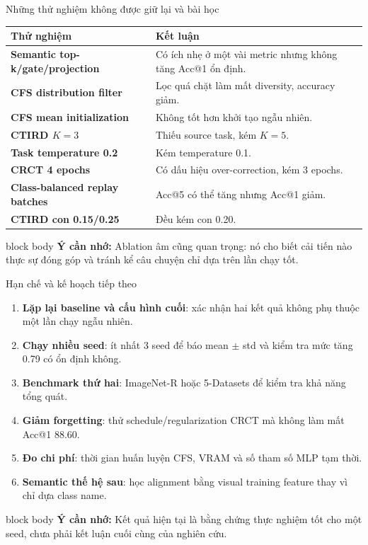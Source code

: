 \documentclass[aspectratio=169,11pt]{beamer}
\newcommand{\remember}[1]{%
  \vfill
  \begin{beamercolorbox}[wd=\textwidth,sep=0.22cm,rounded=true]{block body}
    \textbf{Ý cần nhớ:} #1
  \end{beamercolorbox}
}
\begin{document}
\begin{frame}{Những thử nghiệm không được giữ lại và bài học}
  \small
  \begin{tabularx}{\textwidth}{>{\bfseries}p{3.25cm} X}
    \toprule
    Thử nghiệm & Kết luận \\
    \midrule
    Semantic top-k/gate/projection & Có ích nhẹ ở một vài metric nhưng không tăng Acc@1 ổn định. \\
    CFS distribution filter & Lọc quá chặt làm mất diversity, accuracy giảm. \\
    CFS mean initialization & Không tốt hơn khởi tạo ngẫu nhiên. \\
    CTIRD $K=3$ & Thiếu source task, kém $K=5$. \\
    Task temperature 0.2 & Kém temperature 0.1. \\
    CRCT 4 epochs & Có dấu hiệu over-correction, kém 3 epochs. \\
    Class-balanced replay batches & Acc@5 có thể tăng nhưng Acc@1 giảm. \\
    CTIRD con 0.15/0.25 & Đều kém con 0.20. \\
    \bottomrule
  \end{tabularx}
  \remember{Ablation âm cũng quan trọng: nó cho biết cải tiến nào thực sự đóng góp và tránh kể câu chuyện chỉ dựa trên lần chạy tốt.}
\end{frame}

\begin{frame}{Hạn chế và kế hoạch tiếp theo}
  \begin{enumerate}\setlength\itemsep{0.35cm}
    \item \textbf{Lặp lại baseline và cấu hình cuối}: xác nhận hai kết quả không phụ thuộc một lần chạy ngẫu nhiên.
    \item \textbf{Chạy nhiều seed}: ít nhất 3 seed để báo mean $\pm$ std và kiểm tra mức tăng 0.79 có ổn định không.
    \item \textbf{Benchmark thứ hai}: ImageNet-R hoặc 5-Datasets để kiểm tra khả năng tổng quát.
    \item \textbf{Giảm forgetting}: thử schedule/regularization CRCT mà không làm mất Acc@1 88.60.
    \item \textbf{Đo chi phí}: thời gian huấn luyện CFS, VRAM và số tham số MLP tạm thời.
    \item \textbf{Semantic thế hệ sau}: học alignment bằng visual training feature thay vì chỉ dựa class name.
  \end{enumerate}
  \remember{Kết quả hiện tại là bằng chứng thực nghiệm tốt cho một seed, chưa phải kết luận cuối cùng của nghiên cứu.}
\end{frame}
\end{document}
